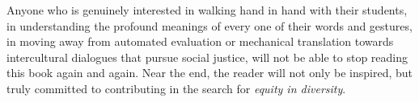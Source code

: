 \documentclass[output=paper]{langscibook}
\begin{document}
Anyone who is genuinely interested in walking hand in hand with their students, in understanding the profound meanings of every one of their words and gestures, in moving away from automated evaluation or mechanical translation towards intercultural dialogues that pursue social justice, will not be able to stop reading this book again and again. Near the end, the reader will not only be inspired, but truly committed to contributing in the search for \textit{equity in diversity}.
\end{document}
